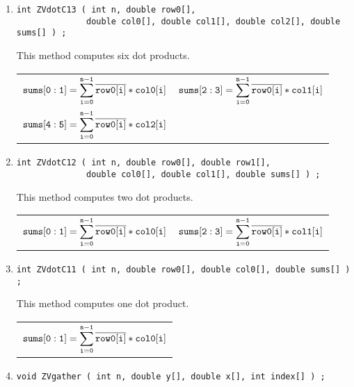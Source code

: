 \begin{enumerate}
\begin{tabular}{l}
\end{tabular}
\item
\begin{verbatim}
int ZVdotC13 ( int n, double row0[], 
              double col0[], double col1[], double col2[], double sums[] ) ;
\end{verbatim}
This method computes six dot products.
\par
\begin{tabular}{ll}
$\displaystyle{\tt sums[0:1]}
= \sum_{\tt i = 0}^{\tt n-1} \overline{\tt row0[i]} * {\tt col0[i]}$ &
$\displaystyle{\tt sums[2:3]}
= \sum_{\tt i = 0}^{\tt n-1} \overline{\tt row0[i]} * {\tt col1[i]}$ \\
$\displaystyle{\tt sums[4:5]}
= \sum_{\tt i = 0}^{\tt n-1} \overline{\tt row0[i]} * {\tt col2[i]}$ 
\end{tabular}
\item
\begin{verbatim}
int ZVdotC12 ( int n, double row0[], double row1[], 
              double col0[], double col1[], double sums[] ) ;
\end{verbatim}
This method computes two dot products.
\par
\begin{tabular}{ll}
$\displaystyle{\tt sums[0:1]}
= \sum_{\tt i = 0}^{\tt n-1} \overline{\tt row0[i]} * {\tt col0[i]}$ &
$\displaystyle{\tt sums[2:3]}
= \sum_{\tt i = 0}^{\tt n-1} \overline{\tt row0[i]} * {\tt col1[i]}$ 
\end{tabular}
\item
\begin{verbatim}
int ZVdotC11 ( int n, double row0[], double col0[], double sums[] ) ;
\end{verbatim}
This method computes one dot product.
\par
\begin{tabular}{l}
$\displaystyle{\tt sums[0:1]}
= \sum_{\tt i = 0}^{\tt n-1} \overline{\tt row0[i]} * {\tt col0[i]}$
\end{tabular}
\item
\begin{verbatim}
void ZVgather ( int n, double y[], double x[], int index[] ) ;

\end{verbatim}
\end{enumerate}
